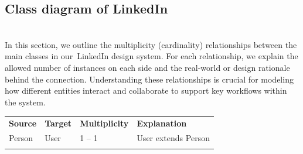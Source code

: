 \subsection{Class diagram of LinkedIn}\label{1pEKtLyCJGMV5-M0gjATg}
\\
In this section, we outline the multiplicity (cardinality) relationships between the main classes in our~LinkedIn design system. For each relationship, we explain the allowed number of instances on each side and the real-world or design rationale behind the connection. Understanding these relationships is crucial for modeling how different entities interact and collaborate to support key workflows within the system.

\begin{center}
{\def\LTcaptype{none} %
\begin{longtable}[]{@{}
>{\raggedright\arraybackslash} p{}
>{\raggedright\arraybackslash} p{}
>{\raggedright\arraybackslash} p{}
>{\raggedright\arraybackslash} p{}@{}}
\toprule\noalign{}
\endhead
\bottomrule\noalign{}
\endlastfoot
\begin{minipage}[t]{\linewidth}\raggedright
\textbf{Source}
\end{minipage} & \begin{minipage}[t]{\linewidth}\raggedright
\textbf{Target}
\end{minipage} & \begin{minipage}[t]{\linewidth}\raggedright
\textbf{Multiplicity}
\end{minipage} & \begin{minipage}[t]{\linewidth}\raggedright
\textbf{Explanation}
\end{minipage} \\
\begin{minipage}[t]{\linewidth}\raggedright
Person
\end{minipage} & \begin{minipage}[t]{\linewidth}\raggedright
User
\end{minipage} & \begin{minipage}[t]{\linewidth}\raggedright
1 -- 1
\end{minipage} & \begin{minipage}[t]{\linewidth}\raggedright
User extends Person
\end{minipage} \\
\begin{minipage}[t]{\linewidth}\raggedright

\end{minipage}
\end{longtable}}
\end{center}
